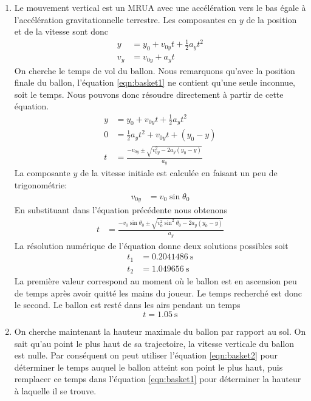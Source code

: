 \begin{enumerate}
  \item
    Le mouvement vertical est un MRUA avec une accélération vers le bas égale à
    l'accélération gravitationnelle terrestre.  Les composantes en $y$ de la
    position et de la vitesse sont donc
    \begin{align}
      y   &= y_0 + v_{0y}t + \frac{1}{2} a_y t^2 \label{eqn:basket1}\\
      v_y &= v_{0y} + a_y t \label{eqn:basket2}
    \end{align}
    On cherche le temps de vol du ballon.  Nous remarquons qu'avec la position
    finale du ballon, l'équation \ref{eqn:basket1} ne contient qu'une seule
    inconnue, soit le temps.  Nous pouvons donc résoudre directement à partir
    de cette équation.
    \begin{align*}
      y &= y_0 + v_{0y} t + \frac{1}{2} a_y t^2 \\
      0 &= \frac{1}{2} a_y t^2 + v_{0y} t + (y_0 - y) \\
      t &= \frac{-v_{0y} \pm \sqrt{v_{0y}^2 - 2a_y(y_0 - y)}}{a_y}
    \end{align*}
    La composante $y$ de la vitesse initiale est calculée en faisant un peu de
    trigonométrie:
    \begin{align*}
      v_{0y} &= v_0 \sin \theta_0
    \end{align*}
    En substituant dans l'équation précédente nous obtenons
    \begin{align*}
      t &= \frac{-v_{0}\sin\theta_0 \pm \sqrt{v_{0}^2\sin^2\theta_0 - 2a_y(y_0 - y)}}{a_y}
    \end{align*}
    La résolution numérique de l'équation donne deux solutions possibles soit
    \begin{align*}
      t_1 &= \SI{0.2041486}{\second} \\
      t_2 &= \SI{1.049656}{\second}
    \end{align*}
    La première valeur correspond au moment où le ballon est en ascension peu
    de temps après avoir quitté les mains du joueur.  Le temps recherché est
    donc le second.  Le ballon est resté dans les airs pendant un temps
    \[
      \boxed{t = \SI{1.05}{\second}}
    \]


  \item On cherche maintenant la hauteur maximale du ballon par rapport au sol.
    On sait qu'au point le plus haut de sa trajectoire, la vitesse verticale du
    ballon est nulle.  Par conséquent on peut utiliser l'équation
    \ref{eqn:basket2} pour déterminer le temps auquel le ballon atteint son
    point le plus haut, puis remplacer ce temps dans l'équation
    \ref{eqn:basket1} pour déterminer la hauteur à laquelle il se trouve.


\end{enumerate}
